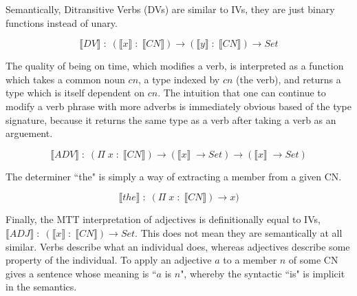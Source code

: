 Semantically, Ditransitive Verbs (DVs) are similar to IVs, they are just binary
functions instead of unary.

$$\llbracket DV \rrbracket\; {:}\; (\llbracket x \rrbracket\; {:}\; \llbracket
CN \rrbracket) \rightarrow (\llbracket y \rrbracket\; {:}\; \llbracket CN
\rrbracket) \rightarrow Set$$

The quality of being on time, which modifies a verb, is interpreted as a function
which takes a common noun $cn$, a type indexed by $cn$ (the verb), and returns a
type which is itself dependent on $cn$. The intuition that one can continue to
modify a verb phrase with more adverbs is immediately obvious based of the type
signature, because it returns the same type as a verb after taking a verb as an
arguement.

$$\llbracket ADV \rrbracket\; {:}\; (\Pi \; x \; {:}\;
\llbracket CN \rrbracket) \rightarrow (\llbracket x \rrbracket\; \rightarrow
Set) \rightarrow (\llbracket x \rrbracket\; \rightarrow Set)$$

The determiner ``the" is simply a way of extracting a member from a given CN.

$$\llbracket the \rrbracket\; {:}\; (\Pi \; x \; {:}\; \llbracket CN \rrbracket) \rightarrow x)$$

Finally, the MTT interpretation of adjectives is definitionally equal to IVs,
$\llbracket ADJ \rrbracket\; {:}\; (\llbracket x \rrbracket\; {:}\; \llbracket
CN \rrbracket) \rightarrow Set$. This does not mean they are semantically at all
similar. Verbs describe what an individual does, whereas adjectives describe
some property of the individual. To apply an adjective $a$ to a member $n$ of
some CN gives a sentence whose meaning is ``$a$ is $n$", whereby the syntactic
``is" is implicit in the semantics.

\begin{code}%
\>[0]\<%
\\
\>[0][@{}l@{\AgdaIndent{0}}]%
\>[2]\AgdaSpace{}%
\AgdaSymbol{:}\AgdaSpace{}%
\AgdaSpace{}%
\AgdaSpace{}%
\AgdaSpace{}%
\AgdaSpace{}%
\<%
\\
%
\>[2]\AgdaSpace{}%
\AgdaSymbol{:}\AgdaSpace{}%
\AgdaSymbol{(}\AgdaSpace{}%
\AgdaSymbol{:}\AgdaSpace{}%
\AgdaSymbol{)}\AgdaSpace{}%
\AgdaSpace{}%
\AgdaSymbol{(}\AgdaSpace{}%
\AgdaSpace{}%
\AgdaSymbol{)}\AgdaSpace{}%
\AgdaSpace{}%
\AgdaSymbol{(}\AgdaSpace{}%
\AgdaSpace{}%
\AgdaSymbol{)}\<%
\\
%
\>[2]\AgdaSpace{}%
\AgdaSymbol{:}\AgdaSpace{}%
\AgdaSymbol{(}\AgdaSpace{}%
\AgdaSymbol{:}\AgdaSpace{}%
\AgdaSymbol{)}\AgdaSpace{}%
%
\>[20]\<%
\\
%
\>[2]\AgdaSpace{}%
\AgdaSymbol{:}\AgdaSpace{}%
\AgdaSpace{}%
\AgdaSpace{}%
\<%
\end{code}

